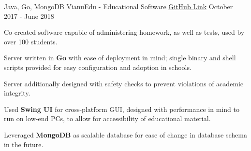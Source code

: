 \begin{cventries}
  \cventry
    {Java, Go, MongoDB}
    {VianuEdu - Educational Software}
    {\href{https://github.com/CNITV/VianuEdu}{GitHub Link}}
    {October 2017 - June 2018}
    {
      \begin{cvitems}
        \item {Co-created software capable of administering homework, as well as tests, used by over 100 students.}
        \item {Server written in \textbf{Go} with ease of deployment in mind; single binary and shell scripts provided for easy configuration and adoption in schools.}
        \item {Server additionally designed with safety checks to prevent violations of academic integrity.}
        \item {Used \textbf{Swing UI} for cross-platform GUI, designed with performance in mind to run on low-end PCs, to allow for accessibility of educational material.}
        \item {Leveraged \textbf{MongoDB} as scalable database for ease of change in database schema in the future.}
      \end{cvitems}
    }
\end{cventries}
